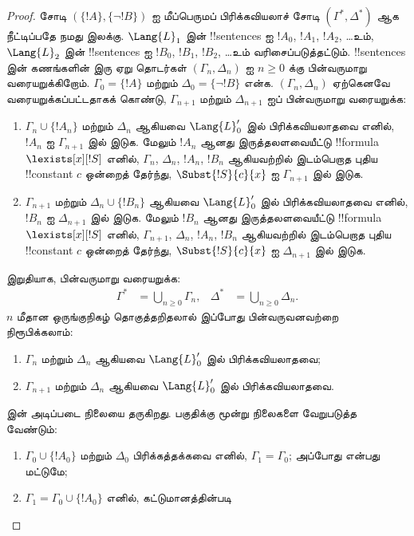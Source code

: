 \documentclass[../../../include/open-logic-section]{subfiles}
\begin{document}
\begin{proof}
சோடி $(\{ !A \}, \{\lnot!B\})$ ஐ மீப்பெருமப் பிரிக்கவியலாச் சோடி
$(\Gamma^*, \Delta^*)$ ஆக நீட்டிப்பதே நமது இலக்கு. $\Lang{L}_1$
இன் !!{sentence}s ஐ $!A_0$, $!A_1$, $!A_2$, \dots உம்,
~$\Lang{L}_2$ இன் !!{sentence}s ஐ $!B_0$, $!B_1$, $!B_2$, \dots உம்
வரிசைப்படுத்தட்டும். !!{sentence}s இன் கணங்களின் இரு ஏறு தொடர்கள்
$(\Gamma_n, \Delta_n)$ ஐ $n \ge 0$ க்கு பின்வருமாறு வரையறுக்கிறோம்.
$\Gamma_0 = \{ !A\}$ மற்றும் $\Delta_0 = \{\lnot !B \}$ என்க.
$(\Gamma_n, \Delta_n)$ ஏற்கெனவே வரையறுக்கப்பட்டதாகக் கொண்டு,
$\Gamma_{n+1}$ மற்றும் $\Delta_{n+1}$ ஐப் பின்வருமாறு வரையறுக்க:
\begin{enumerate}
\item $\Gamma_n \cup \{!A_n \}$ மற்றும் $\Delta_n$ ஆகியவை
  $\Lang{L}'_0$ இல் பிரிக்கவியலாதவை எனில், $!A_n$ ஐ
  $\Gamma_{n+1}$ இல் இடுக. மேலும் $!A_n$ ஆனது இருத்தலளவையீட்டு
  !!{formula} $\lexists[x][!S]$ எனில், $\Gamma_n$, $\Delta_n$,
  $!A_n$, $!B_n$ ஆகியவற்றில் இடம்பெறாத புதிய !!{constant} $c$
  ஒன்றைத் தேர்ந்து, $\Subst{!S}{c}{x}$ ஐ $\Gamma_{n+1}$ இல் இடுக.
\item $\Gamma_{n+1}$ மற்றும் $\Delta_n \cup \{!B_n \}$ ஆகியவை
  $\Lang{L}'_0$ இல் பிரிக்கவியலாதவை எனில், $!B_n$ ஐ
  $\Delta_{n+1}$ இல் இடுக. மேலும் $!B_n$ ஆனது இருத்தலளவையீட்டு
  !!{formula} $\lexists[x][!S]$ எனில், $\Gamma_{n+1}$, $\Delta_n$,
  $!A_n$, $!B_n$ ஆகியவற்றில் இடம்பெறாத புதிய !!{constant} $c$
  ஒன்றைத் தேர்ந்து, $\Subst{!S}{c}{x}$ ஐ $\Delta_{n+1}$ இல் இடுக.
\end{enumerate}
இறுதியாக, பின்வருமாறு வரையறுக்க:
\begin{align*}
  \Gamma^* & = \bigcup_{n\ge 0} \Gamma_n, &
  \Delta^* & = \bigcup_{n\ge 0} \Delta_n.
\end{align*}
$n$ மீதான ஒருங்குநிகழ் தொகுத்தறிதலால் இப்போது பின்வருவனவற்றை
நிரூபிக்கலாம்:
\begin{enumerate}
\item{} $\Gamma_n$ மற்றும் $\Delta_n$ ஆகியவை
  $\Lang{L}'_0$ இல் பிரிக்கவியலாதவை;
\item{} $\Gamma_{n+1}$ மற்றும் $\Delta_n$ ஆகியவை
  $\Lang{L}'_0$ இல் பிரிக்கவியலாதவை.
\end{enumerate}
 இன் அடிப்படை நிலையை  தருகிறது.
 பகுதிக்கு மூன்று நிலைகளை வேறுபடுத்த வேண்டும்:
\begin{enumerate}
\item $\Gamma_0 \cup \{!A_0 \}$ மற்றும் $\Delta_0$ பிரிக்கத்தக்கவை
  எனில், $\Gamma_1 = \Gamma_0$; அப்போது  என்பது
   மட்டுமே;
\item $\Gamma_1 = \Gamma_0 \cup\{ !A_0\}$ எனில், கட்டுமானத்தின்படி

\end{enumerate}
\end{proof}
\end{document}
